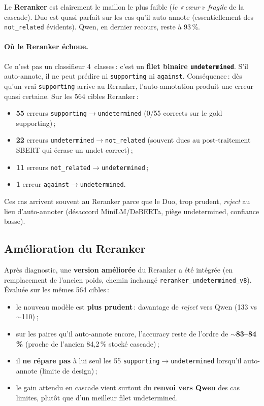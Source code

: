 Le \textbf{Reranker} est clairement le maillon le plus faible (\textit{le «\,cœur\,» fragile} de la cascade). Duo est quasi parfait sur les cas qu'il auto-annote (essentiellement des \texttt{not\_related} évidents). Qwen, en dernier recours, reste à 93\,\%.

\paragraph{Où le Reranker échoue.}
Ce n'est pas un classifieur 4~classes\,: c'est un \textbf{filet binaire \texttt{undetermined}}. S'il auto-annote, il ne peut prédire ni \texttt{supporting} ni \texttt{against}. Conséquence\,: dès qu'un vrai \texttt{supporting} arrive au Reranker, l'auto-annotation produit une erreur quasi certaine. Sur les 564 cibles Reranker\,:

\begin{itemize}
    \item \textbf{55} erreurs \texttt{supporting}$\to$\texttt{undetermined} (0/55 corrects sur le gold supporting)\,;
    \item \textbf{22} erreurs \texttt{undetermined}$\to$\texttt{not\_related} (souvent dues au post-traitement SBERT qui écrase un undet correct)\,;
    \item \textbf{11} erreurs \texttt{not\_related}$\to$\texttt{undetermined}\,;
    \item \textbf{1} erreur \texttt{against}$\to$\texttt{undetermined}.
\end{itemize}

Ces cas arrivent souvent au Reranker parce que le Duo, trop prudent, \emph{reject} au lieu d'auto-annoter (désaccord MiniLM/DeBERTa, piège undetermined, confiance basse).

\subsection*{Amélioration du Reranker}

Après diagnostic, une \textbf{version améliorée} du Reranker a été intégrée (en remplacement de l'ancien poids, chemin inchangé \texttt{reranker\_undetermined\_v8}). Évaluée sur les mêmes 564 cibles\,:

\begin{itemize}
    \item le nouveau modèle est \textbf{plus prudent}\,: davantage de \emph{reject} vers Qwen (133 vs $\sim$110)\,;
    \item sur les paires qu'il auto-annote encore, l'accuracy reste de l'ordre de \textbf{$\sim$83--84\,\%} (proche de l'ancien 84{,}2\,\% stocké cascade)\,;
    \item il \textbf{ne répare pas} à lui seul les 55 \texttt{supporting}$\to$\texttt{undetermined} lorsqu'il auto-annote (limite de design)\,;
    \item le gain attendu en cascade vient surtout du \textbf{renvoi vers Qwen} des cas limites, plutôt que d'un meilleur filet undetermined.
\end{itemize}

